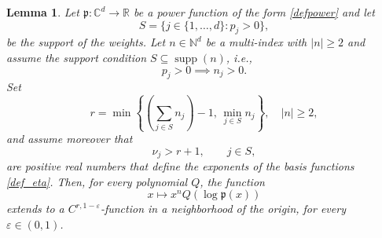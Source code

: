 \documentclass{amsart}
\theoremstyle{plain}
\newtheorem{lemma}[theorem]{Lemma}
\theoremstyle{definition}
\begin{document}
\begin{lemma}\label{lemma_regularity}
Let $\mathfrak p:\mathbb C^d\to\mathbb R$ be a power function of the form \eqref{defpower} and let
\begin{equation}
        S=\{j\in\{1,\ldots,d\}:p_j>0\},
\end{equation}
be the support of the weights. Let $n\in\mathbb N^d$ be a multi-index with
$|n|\geq 2$ and assume the support condition $S\subseteq \operatorname{supp}(n)$, i.e.,
\begin{equation}\label{asslemma}
        p_j>0\implies n_j>0.
\end{equation}
Set
\begin{equation}\label{regularity_index}
        r
        =
        \min\left\{
        \left(\sum_{j\in S} n_j\right)-1,\,
        \min_{j\in S} n_j
        \right\},\quad |n|\geq 2,
\end{equation}
and assume moreover that
\begin{equation}\label{ass_nu_large}
        \nu_j>r+1,
        \qquad j\in S,
\end{equation}
are positive real numbers that define the exponents of the basis functions \eqref{def_eta}.
Then, for every polynomial $Q$, the function
\begin{equation}
        x\mapsto x^n Q(\log\mathfrak p(x))
\end{equation}
extends to a $C^{r,1-\varepsilon}$-function in a neighborhood of the origin, for every
$\varepsilon\in(0,1)$.
\end{lemma}
\end{document}
